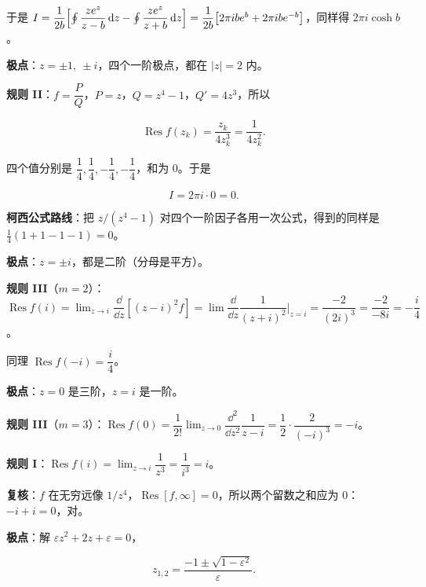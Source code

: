 \documentclass[11pt]{ctexart}
\renewcommand{\qbreak}{\needspace{0.45\textheight}}
\begin{document}
于是 $I=\dfrac{1}{2b}\Bigl[\oint\dfrac{ze^{z}}{z-b}\,\mathrm{d} z-\oint\dfrac{ze^{z}}{z+b}\,\mathrm{d} z\Bigr]=\dfrac{1}{2b}\bigl[2\pi ibe^{b}+2\pi ibe^{-b}\bigr]$，同样得 $2\pi i\cosh b$。

\qbreak
{}

\textbf{极点}：$z=\pm1,\ \pm i$，四个一阶极点，都在 $|z|=2$ 内。

\textbf{规则 II}：$f=\dfrac{P}{Q}$，$P=z$，$Q=z^{4}-1$，$Q'=4z^{3}$，所以

\[ \operatorname{Res}f(z_k)=\frac{z_k}{4z_k^{3}}=\frac{1}{4z_k^{2}} . \]

四个值分别是 $\dfrac14,\dfrac14,-\dfrac14,-\dfrac14$，和为 0。于是

\[ I=2\pi i\cdot0=0 . \]

\textbf{柯西公式路线}：把 $z/(z^{4}-1)$ 对四个一阶因子各用一次公式，得到的同样是 $\frac14(1+1-1-1)=0$。

\qbreak
{}

\textbf{极点}：$z=\pm i$，都是二阶（分母是平方）。

\textbf{规则 III}（$m=2$）：$\operatorname{Res}f(i)=\lim_{z\to i}\dfrac{\dd}{\dd z}\left[(z-i)^{2}f\right]=\lim\dfrac{\dd}{\dd z}\dfrac{1}{(z+i)^{2}}\Big|_{z=i}=\dfrac{-2}{(2i)^{3}}=\dfrac{-2}{-8i}=-\dfrac{i}{4}$。

同理 $\operatorname{Res}f(-i)=\dfrac{i}{4}$。

\qbreak
{}

\textbf{极点}：$z=0$ 是三阶，$z=i$ 是一阶。

\textbf{规则 III}（$m=3$）：$\operatorname{Res}f(0)=\dfrac{1}{2!}\lim_{z\to0}\dfrac{\dd^{2}}{\dd z^{2}}\dfrac{1}{z-i}=\dfrac{1}{2}\cdot\dfrac{2}{(-i)^{3}}=-i$。

\textbf{规则 I}：$\operatorname{Res}f(i)=\lim_{z\to i}\dfrac{1}{z^{3}}=\dfrac{1}{i^{3}}=i$。

\textbf{复核}：$f$ 在无穷远像 $1/z^{4}$，$\operatorname{Res}[f,\infty]=0$，所以两个留数之和应为 0：$-i+i=0$，对。

\qbreak
{}

\textbf{极点}：解 $\varepsilon z^{2}+2z+\varepsilon=0$，

\[ z_{1,2}=\frac{-1\pm\sqrt{1-\varepsilon^{2}}}{\varepsilon} . \]
\end{document}
